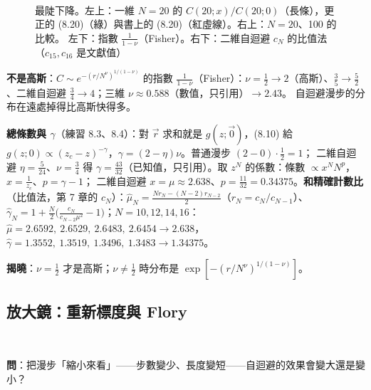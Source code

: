 \begin{figure}[htbp]
\centering
\begin{minipage}[c]{0.5\linewidth}\centering\EightFigSD\end{minipage}\hfill
\begin{minipage}[c]{0.48\linewidth}\centering\footnotesize\setlength{\tabcolsep}{3pt}\EightTabSD\end{minipage}\\[8pt]
{\footnotesize\setlength{\tabcolsep}{4pt}\EightTabFisher\hfill\EightTabRatio}
\caption{最陡下降。左上：一維 $N=20$ 的 $C(20;x)/C(20;0)$（長條），更正的 (8.20)（綠）與書上的 (8.20)（紅虛線）。右上：$N=20$、100 的比較。
左下：指數 $\frac1{1-\nu}$（Fisher）。右下：二維自迴避 $c_N$ 的比值法（$c_{15},c_{16}$ 是文獻值）}\label{eight-fig-sd}
\end{figure}

\textbf{不是高斯}：$C\sim e^{-(r/N^\nu)^{1/(1-\nu)}}$ 的指數 $\frac1{1-\nu}$（Fisher）：$\nu=\frac12\to2$（高斯）、$\frac35\to\frac52$、二維自迴避 $\frac34\to4$；三維 $\nu\approx0.588$（數值，只引用）$\to2.43$。
自迴避漫步的分布在遠處掉得比高斯快得多。

\textbf{總條數與 $\gamma$}（練習 8.3、8.4）：對 $\vec r$ 求和就是 $g(z;\vec 0)$，(8.10) 給 $g(z;0)\propto(z_c-z)^{-\gamma}$，$\gamma=(2-\eta)\nu$。普通漫步 $(2-0)\cdot\frac12=1$；
二維自迴避 $\eta=\frac5{24}$、$\nu=\frac34$ 得 $\gamma=\frac{43}{32}$（已知值，只引用）。取 $z^N$ 的係數：條數 $\propto x^NN^p$，$x=\frac1{z_c}$、$p=\gamma-1$；
二維自迴避 $x=\mu\approx2.638$、$p=\frac{11}{32}=0.34375$。\textbf{和精確計數比}（比值法，第 7 章的 $c_N$）：$\hat\mu_N=\frac{Nr_N-(N-2)r_{N-2}}2$（$r_N=c_N/c_{N-1}$）、
$\hat\gamma_N=1+\frac N2\big(\frac{c_N}{c_{N-2}\mu^2}-1\big)$；$N=10,12,14,16$：$\hat\mu=2.6592,\ 2.6529,\ 2.6483,\ 2.6454\to2.638$，$\hat\gamma=1.3552,\ 1.3519,\ 1.3496,\ 1.3483\to1.34375$。

\textbf{揭曉}：$\nu=\frac12$ 才是高斯；$\nu\ne\frac12$ 時分布是 $\exp[-(r/N^\nu)^{1/(1-\nu)}]$。

\subsection{放大鏡：重新標度與 Flory}
\leavevmode{}\ \par\nopagebreak

\textbf{問}：把漫步「縮小來看」——步數變少、長度變短——自迴避的效果會變大還是變小？

